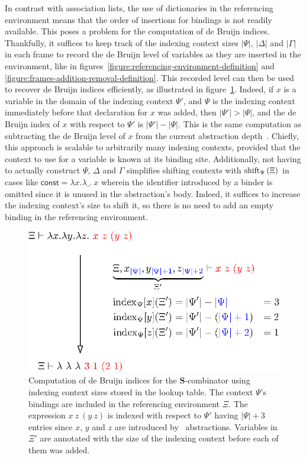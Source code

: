 In contrast with association lists, the use of dictionaries in the referencing environment means that the order of insertions for bindings is not readily available.
This poses a problem for the computation of de Bruijn indices.
Thankfully, it suffices to keep track of the indexing context sizes $|\Psi|$, $|\Delta|$ and $|\Gamma|$ in each frame to record the de Bruijn level of variables as they are inserted in the environment, like in figures~\ref{figure:referencing-environment-definition} and \ref{figure:frames-addition-removal-definition}.
This recorded level can then be used to recover de Bruijn indices efficiently, as illustrated in figure~\ref{figure:lf-indexing}.
Indeed, if $x$ is a variable in the domain of the indexing context $\Psi'$, and $\Psi$ is the indexing context immediately before that declaration for $x$ was added, then $|\Psi'| > |\Psi|$, and the de Bruijn index of $x$ with respect to $\Psi'$ is $|\Psi'| - |\Psi|$.
This is the same computation as subtracting the de Bruijn level of $x$ from the current abstraction depth~\cite{DEBRUIJN1972381, debruijnlevels1995}.
Chiefly, this approach is scalable to arbitrarily many indexing contexts, provided that the context to use for a variable is known at its binding site.
Additionally, not having to actually construct $\Psi$, $\Delta$ and $\Gamma$ simplifies shifting contexts with $\operatorname{shift}_{\Psi}\left(\Xi\right)$ in cases like $\mathsf{const} = \lambda x.\lambda\_.\ x$ wherein the identifier introduced by a binder is omitted since it is unused in the abstraction's body.
Indeed, it suffices to increase the indexing context's size to shift it, so there is no need to add an empty binding in the referencing environment.

\begin{figure}[H]
\centering
\includegraphics{figures/lf-indexing.eps}
\caption[Example of de Bruijn indices computation with respect to a lookup table]{%
Computation of de Bruijn indices for the $\mathbf{S}$-combinator using indexing context sizes stored in the lookup table.
The \LF context $\Psi$'s bindings are included in the referencing environment $\Xi$.
The expression $x\ z\ (y\ z)$ is indexed with respect to $\Psi'$ having $|\Psi| + 3$ entries since $x$, $y$ and $z$ are introduced by \LF~abstractions.
Variables in $\Xi'$ are annotated with the size of the \LF indexing context before each of them was added.
}
\label{figure:lf-indexing}
\end{figure}

